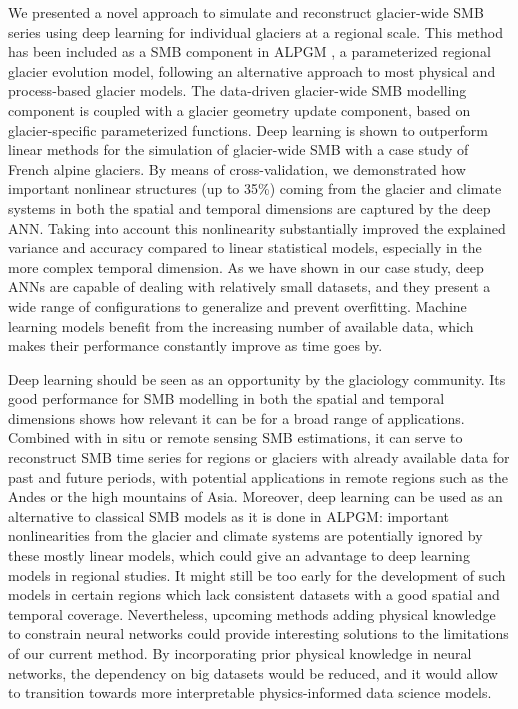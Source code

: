 We presented a novel approach to simulate and reconstruct glacier-wide SMB series using deep learning for individual glaciers at a regional scale. This method has been included as a SMB component in ALPGM \citep{bolibar_jordibolibar/alpgm:_2019}, a parameterized regional glacier evolution model, following an alternative approach to most physical and process-based glacier models. The data-driven glacier-wide SMB modelling component is coupled with a glacier geometry update component, based on glacier-specific parameterized functions. Deep learning is shown to outperform linear methods for the simulation of glacier-wide SMB with a case study of French alpine glaciers. By means of cross-validation, we demonstrated how important nonlinear structures (up to 35\%) coming from the glacier and climate systems in both the spatial and temporal dimensions are captured by the deep ANN. Taking into account this nonlinearity substantially improved the explained variance and accuracy compared to linear statistical models, especially in the more complex temporal dimension. As we have shown in our case study, deep ANNs are capable of dealing with relatively small datasets, and they present a wide range of configurations to generalize and prevent overfitting. Machine learning models benefit from the increasing number of available data, which makes their performance constantly improve as time goes by. 

Deep learning should be seen as an opportunity by the glaciology community. Its good performance for SMB modelling in both the spatial and temporal dimensions shows how relevant it can be for a broad range of applications. Combined with in situ or remote sensing SMB estimations, it can serve to reconstruct SMB time series for regions or glaciers with already available data for past and future periods, with potential applications in remote regions such as the Andes or the high mountains of Asia. Moreover, deep learning can be used as an alternative to classical SMB models as it is done in ALPGM: important nonlinearities from the glacier and climate systems are potentially ignored by these mostly linear models, which could give an advantage to deep learning models in regional studies. It might still be too early for the development of such models in certain regions which lack consistent datasets with a good spatial and temporal coverage. Nevertheless, upcoming methods adding physical knowledge to constrain neural networks \cite[e.g.,][]{karpatne_physics-guided_2018, rackauckas_universal_2020} could provide interesting solutions to the limitations of our current method. By incorporating prior physical knowledge in neural networks, the dependency on big datasets would be reduced, and it would allow to transition towards more interpretable physics-informed data science models. 

